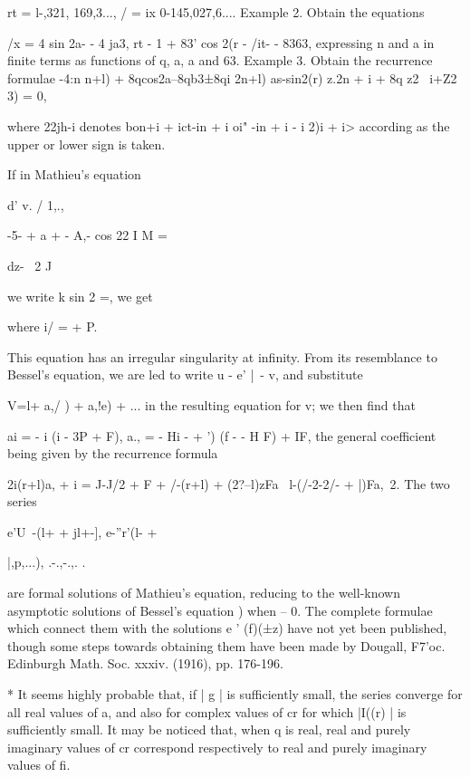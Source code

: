 {{rt = l-,321, 169,3..., / = ix 0-145,027,6.... Example 2. Obtain the
equations

/x = 4 sin 2a- - 4 ja3, rt - 1 + 83' cos 2(r - /it- - 8363,
expressing n and a in finite terms as functions of q, a, a and 63.
Example 3. Obtain the recurrence formulae -4:n n+l) +
8qcos2a--8qb3±8qi 2n+l) as-sin2(r) z.2n + i + 8q z2 \ i+Z2 3) = 0,

where 22jh-i denotes bon+i + ict-in + i oi" -in + i - i 2)i + i>
according as the upper or lower sign is taken.


If in Mathieu's equation

d' v. / 1,., \

-5- + a + - A,- cos 22 I M =

dz- \ 2 J

we write k sin 2 =, we get

where i/ = + P.

This equation has an irregular singularity at infinity. From its
resemblance to Bessel's equation, we are led to write u - e' |~- v,
and substitute

V=l+ a,/ ) + a,!e) + ... in the resulting equation for v; we then
find that

ai = - i (i - 3P + F), a., = - Hi - + ') (f - - H F) + IF, the
general coefficient being given by the recurrence formula

2i(r+l)a, + i = J-J/2 + F + /-(r+l) + (2?--l)zFa \ l-(/-2-2/- + |)Fa,\
2. The two series

e'U~-(l+ + jl+-], e-''r'(l- +

|,p,...), .-.,-.,. . \

are formal solutions of Mathieu's equation, reducing to the well-known
asymptotic solutions of Bessel's equation \hardsectionref{17}{5}) when -- 0. The
complete formulae which connect them with the solutions e ' (f)(±z)
have not yet been published, though some steps towards obtaining them
have been made by Dougall, F7'oc. Edinburgh Math. Soc. xxxiv. (1916),
pp. 176-196.

* It seems highly probable that, if | g | is sufficiently small, the
series converge for all real values of a, and also for complex values
of cr for which |I((r) | is sufficiently small. It may be noticed
that, when q is real, real and purely imaginary values of cr
correspond respectively to real and purely imaginary values of fi.

%
%

}}
